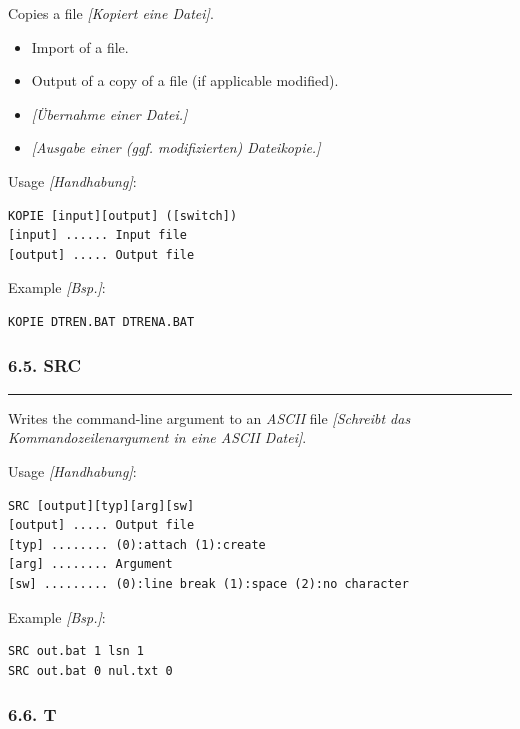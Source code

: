 \documentclass[
]{article}
\begin{document}
Copies a file \emph{{[}Kopiert eine Datei{]}}.

\begin{itemize}
\item
  Import of a file.
\item
  Output of a copy of a file (if applicable modified).
\item
  \emph{{[}Übernahme einer Datei.{]}}
\item
  \emph{{[}Ausgabe einer (ggf. modifizierten) Dateikopie.{]}}
\end{itemize}

Usage \emph{{[}Handhabung{]}}:

\begin{verbatim}
KOPIE [input][output] ([switch]) 
[input] ...... Input file 
[output] ..... Output file 
\end{verbatim}

Example \emph{{[}Bsp.{]}}:

\begin{verbatim}
KOPIE DTREN.BAT DTRENA.BAT
\end{verbatim}

\hypertarget{src}{%
\subsubsection{6.5. SRC}\label{src}}

\begin{center}\rule{0.5\linewidth}{0.5pt}\end{center}

Writes the command-line argument to an \emph{ASCII} file
\emph{{[}Schreibt das Kommandozeilenargument in eine ASCII Datei{]}}.

Usage \emph{{[}Handhabung{]}}:

\begin{verbatim}
SRC [output][typ][arg][sw]
[output] ..... Output file
[typ] ........ (0):attach (1):create 
[arg] ........ Argument
[sw] ......... (0):line break (1):space (2):no character
\end{verbatim}

Example \emph{{[}Bsp.{]}}:

\begin{verbatim}
SRC out.bat 1 lsn 1
SRC out.bat 0 nul.txt 0
\end{verbatim}

\hypertarget{t}{%
\subsubsection{6.6. T}\label{t}}
\end{document}
